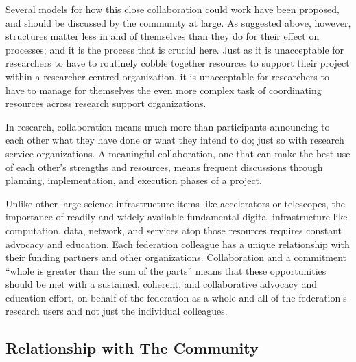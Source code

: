 \documentclass[11pt, letterpaper, twoside]{article}
\begin{document}

Several models for how this close collaboration could work have been
proposed, and should be discussed by the community at large. As
suggested above, however, structures matter less in and of themselves
than they do for their effect on processes; and it is the process that
is crucial here. Just as it is unacceptable for researchers to have to
routinely cobble together resources to support their project within a
researcher-centred organization, it is unacceptable for researchers to
have to manage for themselves the even more complex task of coordinating
resources across research support organizations.

In research, collaboration means much more than participants announcing
to each other what they have done or what they intend to do; just so
with research service organizations. A meaningful collaboration, one
that can make the best use of each other's strengths and resources,
means frequent discussions through planning, implementation, and
execution phases of a project.


Unlike other large science infrastructure items like accelerators or
telescopes, the importance of readily and widely available fundamental
digital infrastructure like computation, data, network, and services
atop those resources requires constant advocacy and education. Each
federation colleague has a unique relationship with their funding
partners and other organizations. Collaboration and a commitment ``whole
is greater than the sum of the parts'' means that these opportunities
should be met with a sustained, coherent, and collaborative advocacy and
education effort, on behalf of the federation as a whole and all of the
federation's research users and not just the individual colleagues.

\subsection*{Relationship with The Community}
%

\end{document}
